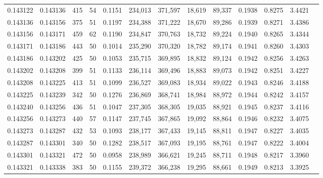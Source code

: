 \begin{tabular}{rrrrrrrrrrrrr}
0.143122 & 0.143136 &   415 &  54 &                                     0.1151 & 234,013 & 371,597 &  18,619 &  89,337 & 0.1938 & 0.8275 & 3.4421 \\
0.143136 & 0.143156 &   375 &  51 &                                     0.1197 & 234,388 & 371,222 &  18,670 &  89,286 & 0.1939 & 0.8271 & 3.4386 \\
0.143156 & 0.143171 &   459 &  62 &                                     0.1190 & 234,847 & 370,763 &  18,732 &  89,224 & 0.1940 & 0.8265 & 3.4344 \\
0.143171 & 0.143186 &   443 &  50 &                                     0.1014 & 235,290 & 370,320 &  18,782 &  89,174 & 0.1941 & 0.8260 & 3.4303 \\
0.143186 & 0.143202 &   425 &  50 &                                     0.1053 & 235,715 & 369,895 &  18,832 &  89,124 & 0.1942 & 0.8256 & 3.4263 \\
0.143202 & 0.143208 &   399 &  51 &                                     0.1133 & 236,114 & 369,496 &  18,883 &  89,073 & 0.1942 & 0.8251 & 3.4227 \\
0.143208 & 0.143225 &   413 &  51 &                                     0.1099 & 236,527 & 369,083 &  18,934 &  89,022 & 0.1943 & 0.8246 & 3.4188 \\
0.143225 & 0.143239 &   342 &  50 &                                     0.1276 & 236,869 & 368,741 &  18,984 &  88,972 & 0.1944 & 0.8242 & 3.4157 \\
0.143240 & 0.143256 &   436 &  51 &                                     0.1047 & 237,305 & 368,305 &  19,035 &  88,921 & 0.1945 & 0.8237 & 3.4116 \\
0.143256 & 0.143273 &   440 &  57 &                                     0.1147 & 237,745 & 367,865 &  19,092 &  88,864 & 0.1946 & 0.8232 & 3.4075 \\
0.143273 & 0.143287 &   432 &  53 &                                     0.1093 & 238,177 & 367,433 &  19,145 &  88,811 & 0.1947 & 0.8227 & 3.4035 \\
0.143287 & 0.143301 &   340 &  50 &                                     0.1282 & 238,517 & 367,093 &  19,195 &  88,761 & 0.1947 & 0.8222 & 3.4004 \\
0.143301 & 0.143321 &   472 &  50 &                                     0.0958 & 238,989 & 366,621 &  19,245 &  88,711 & 0.1948 & 0.8217 & 3.3960 \\
0.143321 & 0.143338 &   383 &  50 &                                     0.1155 & 239,372 & 366,238 &  19,295 &  88,661 & 0.1949 & 0.8213 & 3.3925 \\

\end{tabular}

